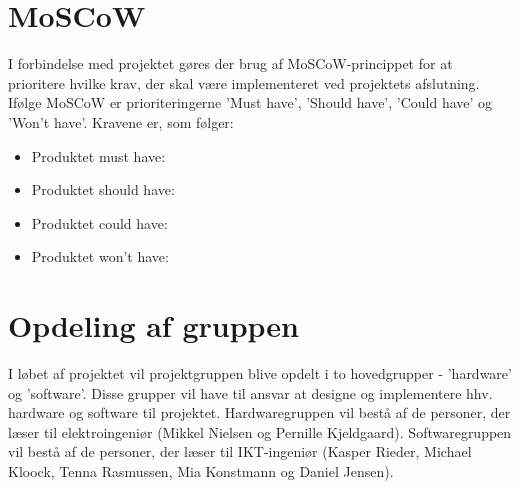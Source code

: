 \section{MoSCoW}
I forbindelse med projektet gøres der brug af MoSCoW-princippet for at prioritere hvilke krav, der skal være implementeret ved projektets afslutning. Ifølge MoSCoW er prioriteringerne 'Must have', 'Should have', 'Could have' og 'Won't have'. Kravene er, som følger:
\begin{itemize}
	\item{Produktet must have:}
	\item{Produktet should have:}
	\item{Produktet could have:}
	\item{Produktet won't have:}
\end{itemize}


\section{Opdeling af gruppen}
I løbet af projektet vil projektgruppen blive opdelt i to hovedgrupper - 'hardware' og 'software'. Disse grupper vil have til ansvar at designe og implementere hhv. hardware og software til projektet. Hardwaregruppen vil bestå af de personer, der læser til elektroingeniør (Mikkel Nielsen og Pernille Kjeldgaard). Softwaregruppen vil bestå af de personer, der læser til IKT-ingeniør (Kasper Rieder, Michael Kloock, Tenna Rasmussen, Mia Konstmann og Daniel Jensen).


